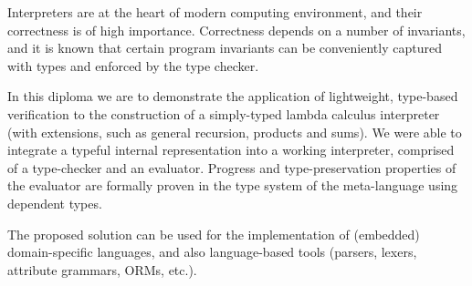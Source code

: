 Interpreters are at the heart of modern computing environment, and their correctness is of high importance. Correctness depends on a number of invariants, and it is known that certain program invariants can be conveniently captured with types and enforced by the type checker.

In this diploma we are to demonstrate the application of lightweight, type-based verification to the construction of a simply-typed lambda calculus interpreter (with extensions, such as general recursion, products and sums). We were able to integrate a typeful internal representation into a working interpreter, comprised of a type-checker and an evaluator. Progress and type-preservation properties of the evaluator are formally proven in the type system of the meta-language using dependent types.

The proposed solution can be used for the implementation of (embedded) domain-specific languages, and also language-based tools (parsers, lexers, attribute grammars, ORMs, etc.).
